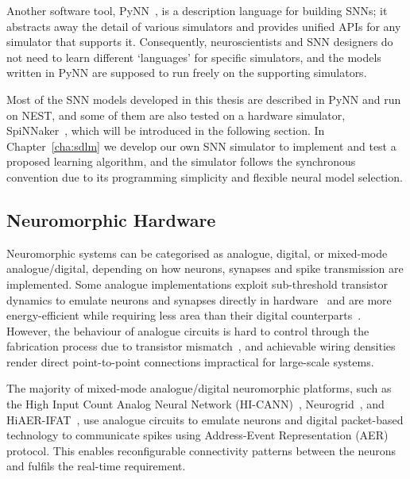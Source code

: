 Another software tool, PyNN~\citep{davison2008pynn}, is a description language for building SNNs;
it abstracts away the detail of various simulators and provides unified APIs for any simulator that supports it.
Consequently, neuroscientists and SNN designers do not need to learn different `languages' for specific simulators, and the models written in PyNN are supposed to run freely on the supporting simulators.

Most of the SNN models developed in this thesis are described in PyNN and run on NEST, and some of them are also tested on a hardware simulator, SpiNNaker~\citep{furber2014spinnaker}, which will be introduced in the following section.
In Chapter~\ref{cha:sdlm} we develop our own SNN simulator to implement and test a proposed learning algorithm, and the simulator follows the synchronous convention due to its programming simplicity and flexible neural model selection. 

\subsection{Neuromorphic Hardware}
\label{subsec:neuromorphic_hw}
Neuromorphic systems can be categorised as analogue, digital, or mixed-mode analogue/digital, depending on how neurons, synapses and spike transmission are implemented. %
Some analogue implementations exploit sub-threshold transistor dynamics to emulate neurons and synapses directly in hardware~\citep{indiveri2011neuromorphic} and are more energy-efficient while requiring less area than their digital counterparts~\citep{joubert2012hardware}.
However, the behaviour of analogue circuits is hard to control through the fabrication process due to transistor mismatch~\citep{indiveri2011neuromorphic,pedram2006thermal,linares2003compact}, and achievable wiring densities render direct point-to-point connections impractical for large-scale systems.

The majority of mixed-mode analogue/digital neuromorphic platforms, such as the High Input Count Analog Neural Network (HI-CANN)~\citep{schemmel2010wafer}, Neurogrid~\citep{benjamin2014neurogrid}, and HiAER-IFAT~\citep{yu201265k}, use analogue circuits to emulate neurons and digital packet-based technology to communicate spikes using Address-Event Representation (AER)~\citep{lazzaro1995multi} protocol.
This enables reconfigurable connectivity patterns between the neurons and fulfils the real-time requirement.

